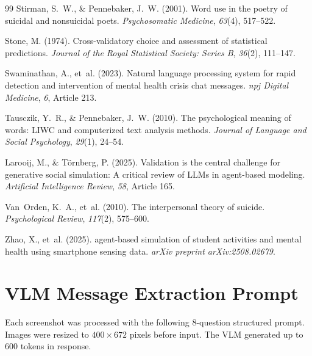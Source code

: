 \documentclass[review,12pt,authoryear]{elsarticle}
\begin{document}
\begin{thebibliography}{99}
Stirman, S.~W., \& Pennebaker, J.~W. (2001).
\newblock Word use in the poetry of suicidal and nonsuicidal poets.
\newblock \textit{Psychosomatic Medicine}, \textit{63}(4), 517--522.

Stone, M. (1974).
\newblock Cross-validatory choice and assessment of statistical predictions.
\newblock \textit{Journal of the Royal Statistical Society: Series B}, \textit{36}(2), 111--147.

Swaminathan, A., et~al. (2023).
\newblock Natural language processing system for rapid detection and intervention of mental health crisis chat messages.
\newblock \textit{npj Digital Medicine}, \textit{6}, Article 213.

Tausczik, Y.~R., \& Pennebaker, J.~W. (2010).
\newblock The psychological meaning of words: {LIWC} and computerized text analysis methods.
\newblock \textit{Journal of Language and Social Psychology}, \textit{29}(1), 24--54.

Larooij, M., \& T{\"o}rnberg, P. (2025).
\newblock Validation is the central challenge for generative social simulation: {A} critical review of {LLMs} in agent-based modeling.
\newblock \textit{Artificial Intelligence Review}, \textit{58}, Article 165.

Van~Orden, K.~A., et~al. (2010).
\newblock The interpersonal theory of suicide.
\newblock \textit{Psychological Review}, \textit{117}(2), 575--600.

Zhao, X., et~al. (2025).
 agent-based simulation of student activities and mental health using smartphone sensing data.
\newblock \textit{arXiv preprint arXiv:2508.02679}.

\end{thebibliography}


\appendix

\section{VLM Message Extraction Prompt}\label{app:vlm_prompts}

Each screenshot was processed with the following 8-question structured prompt. Images were resized to $400 \times 672$ pixels before input. The VLM generated up to 600 tokens in response.
\end{document}
